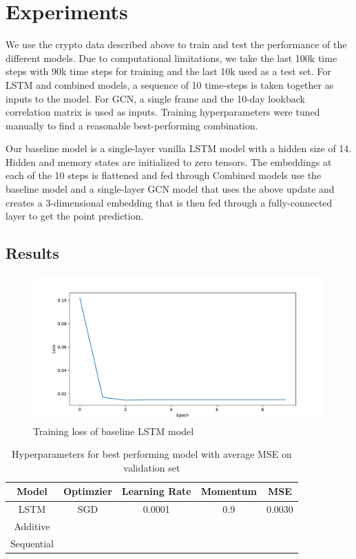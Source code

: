 \section{Experiments}

We use the crypto data described above to train and test the performance of the different models. Due to computational limitations, we take the last 100k time steps with 90k time steps for training and the last 10k used as a test set. For LSTM and combined models, a sequence of 10 time-steps is taken together as inputs to the model. For GCN, a single frame and the 10-day lookback correlation matrix is used as inputs. Training hyperparameters were tuned manually to find a reasonable best-performing combination.

Our baseline model is a single-layer vanilla LSTM model with a hidden size of 14. Hidden and memory states are initialized to zero tensors. The embeddings at each of the 10 steps is flattened and fed through  Combined models use the baseline model and a single-layer GCN model that uses the above update and creates a 3-dimensional embedding that is then fed through a fully-connected layer to get the point prediction.

\subsection{Results}

\begin{figure}[H]
	\centering
	\includegraphics[width=\linewidth]{../../figures/vanilla_lstm_training_loss.pdf}
	\caption{Training loss of baseline LSTM model}
	\label{fig:lstm_loss}
\end{figure}

\begin{table}[H]
	\centering
	\begin{tabular}{|c|c|c|c|c|}
	\hline
	Model & Optimzier & Learning Rate & Momentum & MSE \\
	\hline
	LSTM & SGD & 0.0001 & 0.9 & 0.0030 \\
	Additive & & & & \\
	Sequential & & & & \\
	\hline
	\end{tabular}
	\caption{Hyperparameters for best performing model with average MSE on validation set}
	\label{tab:results_summary}
\end{table}